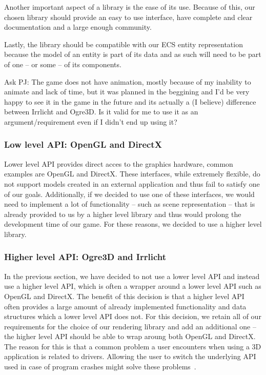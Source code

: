 Another important aspect of a library is the ease of its use. Because of this, our chosen library should provide an easy to use
interface, have complete and clear documentation and a large enough community.

Lastly, the library should be compatible with our ECS entity representation because the model of an entity is part of its data and
as such will need to be part of one -- or some -- of its components.

\bigskip
Ask PJ: The game does not have animation, mostly because of my inability to animate and lack of time, but it was planned in the beggining
and I'd be very happy to see it in the game in the future and its actually a (I believe) difference between Irrlicht and Ogre3D. Is it
valid for me to use it as an argument/requirement even if I didn't end up using it?

\subsubsection{Low level API: OpenGL and DirectX}

Lower level API provides direct acces to the graphics hardware, common examples are OpenGL and DirectX. These interfaces, while
extremely flexible, do not support models created in an external application and thus fail to satisfy one of our goals. Additionally,
if we decided to use one of these interfaces, we would need to implement a lot of functionality -- such as scene representation -- that 
is already provided to us by a higher level library and thus would prolong the development time of our game. For these reasons, we decided 
to use a higher level library.

\subsubsection{Higher level API: Ogre3D and Irrlicht}

In the previous section, we have decided to not use a lower level API and instead use a higher level API, which is often a wrapper around
a lower level API such as OpenGL and DirectX. The benefit of this decision is that a higher level API often provides a large amount
of already implemented functionality and data structures which a lower level API does not. For this decision, we retain all of our
requirements for the choice of our rendering
library and add an additional one -- the higher level API should be able to wrap aroung both OpenGL and DirectX. The reason for this is
that a common problem a user encounters when using a 3D application is related to drivers. Allowing the user to switch the underlying
API used in case of program crashes might solve these problems~\cite{BothOpenGLAndDirectX}.

